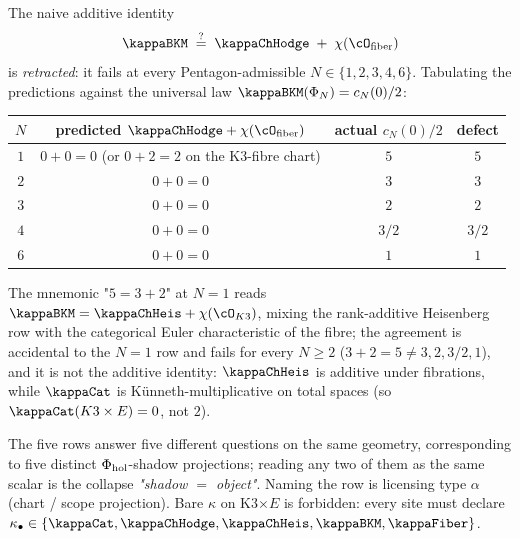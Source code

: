 \begin{remark}
The naive additive identity
\[
 \kappaBKM \;\stackrel{?}{=}\; \kappaChHodge \;+\;
 \chi(\cO_{\mathrm{fiber}})
\]
is \emph{retracted}: it fails at every Pentagon-admissible
$N \in \{1, 2, 3, 4, 6\}$. Tabulating the predictions against the
universal law $\kappaBKM(\Phi_N) = c_N(0)/2$:
\begin{center}
\renewcommand{\arraystretch}{1.2}
\begin{tabular}{c|c|c|c}
$N$ & predicted $\kappaChHodge + \chi(\cO_{\mathrm{fiber}})$ & actual $c_N(0)/2$ & defect \\
\hline
$1$ & $0 + 0 = 0$ (or $0 + 2 = 2$ on the K3-fibre chart) & $5$ & $5$ \\
$2$ & $0 + 0 = 0$ & $3$ & $3$ \\
$3$ & $0 + 0 = 0$ & $2$ & $2$ \\
$4$ & $0 + 0 = 0$ & $3/2$ & $3/2$ \\
$6$ & $0 + 0 = 0$ & $1$ & $1$ \\
\end{tabular}
\end{center}
The mnemonic "$5 = 3 + 2$" at $N = 1$ reads
$\kappaBKM = \kappaChHeis + \chi(\cO_{K3})$, mixing the
rank-additive Heisenberg row with the categorical Euler
characteristic of the fibre; the agreement is accidental to the
$N = 1$ row and fails for every $N \ge 2$
($3 + 2 = 5 \ne 3, 2, 3/2, 1$), and it is not
the additive identity: $\kappaChHeis$ is additive under
fibrations, while $\kappaCat$ is K\"unneth-multiplicative on
total spaces (so $\kappaCat(K3 \times E) = 0$, not $2$).

The five rows answer five different questions on the same
geometry, corresponding to five distinct $\Phi_{\mathrm{hol}}$-shadow
projections; reading any two of them as the same scalar is the
collapse \emph{"shadow $=$ object"}. Naming the row is licensing
type $\alpha$ (chart / scope projection). Bare $\kappa$ on
K3$\times E$ is forbidden: every site must declare
$\kappa_\bullet \in \{\kappaCat, \kappaChHodge, \kappaChHeis,
\kappaBKM, \kappaFiber\}$.


\end{remark}
